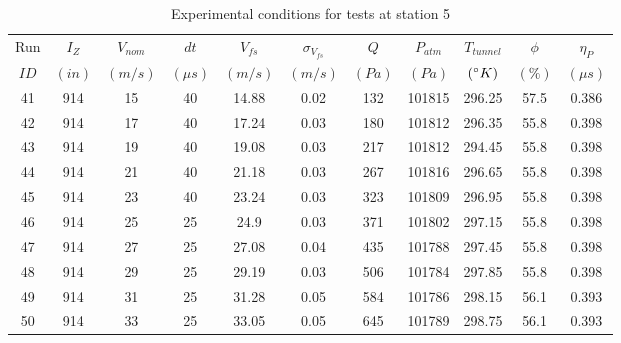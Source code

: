 \begin{table}[H]
\begin{center}
\begin{tabular}{|ccccccccccc|}
	\hline
	Run & $I_Z$ & $V_{nom}$ & $dt$ & $V_{fs}$ & $\sigma_{V_{fs}}$ & $Q$ & $P_{atm}$ & $T_{tunnel}$ & $\phi$ & $\eta_P$\\
	$ID$ & $(in)$ & $(m/s)$ & $(\mu s)$ & $(m/s)$ & $(m/s)$ & $(Pa)$ & $(Pa)$ & $(\degree K)$ & $(\%)$ & $(\mu s)$\\
	\hline
	41 & 914 & 15 & 40 & 14.88 & 0.02 & 132 & 101815 & 296.25 & 57.5 & 0.386\\
	42 & 914 & 17 & 40 & 17.24 & 0.03 & 180 & 101812 & 296.35 & 55.8 & 0.398\\
	43 & 914 & 19 & 40 & 19.08 & 0.03 & 217 & 101812 & 294.45 & 55.8 & 0.398\\
	44 & 914 & 21 & 40 & 21.18 & 0.03 & 267 & 101816 & 296.65 & 55.8 & 0.398\\
	45 & 914 & 23 & 40 & 23.24 & 0.03 & 323 & 101809 & 296.95 & 55.8 & 0.398\\
	46 & 914 & 25 & 25 & 24.9 & 0.03 & 371 & 101802 & 297.15 & 55.8 & 0.398\\
	47 & 914 & 27 & 25 & 27.08 & 0.04 & 435 & 101788 & 297.45 & 55.8 & 0.398\\
	48 & 914 & 29 & 25 & 29.19 & 0.03 & 506 & 101784 & 297.85 & 55.8 & 0.398\\
	49 & 914 & 31 & 25 & 31.28 & 0.05 & 584 & 101786 & 298.15 & 56.1 & 0.393\\
	50 & 914 & 33 & 25 & 33.05 & 0.05 & 645 & 101789 & 298.75 & 56.1 & 0.393\\
	\hline
\end{tabular}
\caption{Experimental conditions for tests at station 5}
\label{table:station_5_measurements.}
\end{center}
\end{table}
